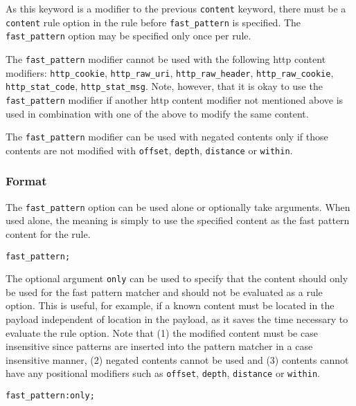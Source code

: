 \documentclass[english]{report}
\newenvironment{note}{
\samepage
    \vspace{10pt}{\textsf{
        {\hspace{7pt}\Huge{$\triangle$\hspace{-12.5pt}{\Large{$^!$}}}}\hspace{5pt}
        {\Large{NOTE}}
    }
    }
   \begin{center}
    \par\vspace{-17pt}

    \begin{lrbox}{\savepar}
    \begin{minipage}[r]{6in}
}
{
    \end{minipage}
    \end{lrbox}
    \fbox{
        \usebox{
            \savepar
	}
    }
    \par\vskip10pt
    \end{center}
}
\newenvironment{note}{
        \begin{rawhtml}
        <p><table border="1"><tr><td><b>
        Note:&nbsp;&nbsp;</b>
        \end{rawhtml}
}{
        \begin{rawhtml}
        </b></td></tr></table></p>
        \end{rawhtml}
}
\begin{document}
As this keyword is a modifier to the previous \texttt{content} keyword, there must be
a \texttt{content} rule option in the rule before \texttt{fast\_pattern} is specified.
The \texttt{fast\_pattern} option may be specified only once per rule.

\begin{note}
The \texttt{fast\_pattern} modifier cannot be used with the following http
content modifiers: \texttt{http\_cookie}, \texttt{http\_raw\_uri},
\texttt{http\_raw\_header}, \texttt{http\_raw\_cookie},
\texttt{http\_stat\_code}, \texttt{http\_stat\_msg}.  Note, however, that
it is okay to use the \texttt{fast\_pattern} modifier if another http content
modifier not mentioned above is used in combination with one of the above
to modify the same content.
\end{note}

\begin{note}
The \texttt{fast\_pattern} modifier can be used with negated contents only if
those contents are not modified with \texttt{offset}, \texttt{depth},
\texttt{distance} or \texttt{within}.
\end{note}

\subsubsection{Format}
The \texttt{fast\_pattern} option can be used alone or optionally take arguments.
When used alone, the meaning is simply to use the specified content as the
fast pattern content for the rule.

\begin{verbatim}
fast_pattern;
\end{verbatim}

The optional argument \texttt{only} can be used to specify that the content
should only be used for the fast pattern matcher and should not be evaluated
as a rule option.  This is useful, for example, if a known content must be
located in the payload independent of location in the payload, as it saves
the time necessary to evaluate the rule option.  
Note that (1) the modified content must be case insensitive since
patterns are inserted into the pattern matcher in a case insensitive manner,
(2) negated contents cannot be used and (3) contents cannot have any positional
modifiers such as \texttt{offset}, \texttt{depth}, \texttt{distance}
or \texttt{within}.
\begin{verbatim}
fast_pattern:only;
\end{verbatim}
\end{document}
